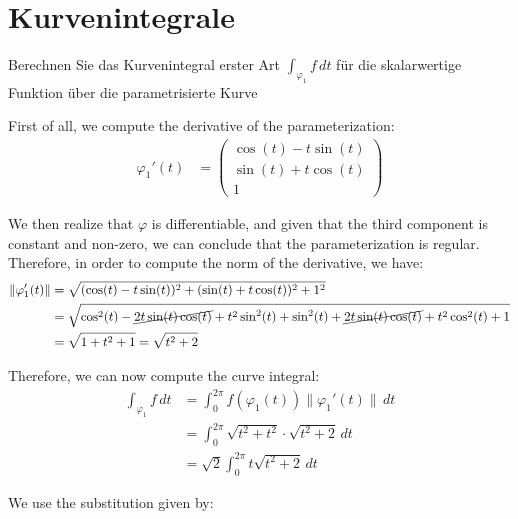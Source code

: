 \section{Kurvenintegrale}

\begin{ejercicio}
Berechnen Sie das Kurvenintegral erster Art $\displaystyle \int_{\varphi_1} f \, dt$ für die skalarwertige Funktion
über die parametrisierte Kurve

    First of all, we compute the derivative of the parameterization:
    \begin{align*}
        \varphi_1'(t) &= \begin{pmatrix}
            \cos(t) - t\sin(t) \\
            \sin(t) + t\cos(t) \\
            1
        \end{pmatrix}
    \end{align*}

    We then realize that $\varphi$ is differentiable, and given that the third component is constant and non-zero, we can conclude that the parameterization is regular. Therefore, in order to compute the norm of the derivative, we have:
    \begin{align*}
        \|\varphi_1'(t)\| &= \sqrt{(\cos(t) - t\sin(t))^2 + (\sin(t) + t\cos(t))^2 + 1^2} \\
        &= \sqrt{\cos^2(t) - \cancel{2t\sin(t)\cos(t)} + t^2\sin^2(t) + \sin^2(t) + \cancel{2t\sin(t)\cos(t)} + t^2\cos^2(t) + 1} \\
        &= \sqrt{1 + t^2 + 1}
        = \sqrt{t^2 + 2}
    \end{align*}

    Therefore, we can now compute the curve integral:
    \begin{align*}
        \int_{\varphi_1} f \, dt &= \int_0^{2\pi} f(\varphi_1(t)) \|\varphi_1'(t)\| \, dt \\
        &= \int_0^{2\pi} \sqrt{t^2 + t^2}
        \cdot
        \sqrt{t^2 + 2} \, dt \\
        &= \sqrt{2} \int_0^{2\pi} t \sqrt{t^2 + 2}\, dt
    \end{align*}

    We use the substitution given by:


\end{ejercicio}
